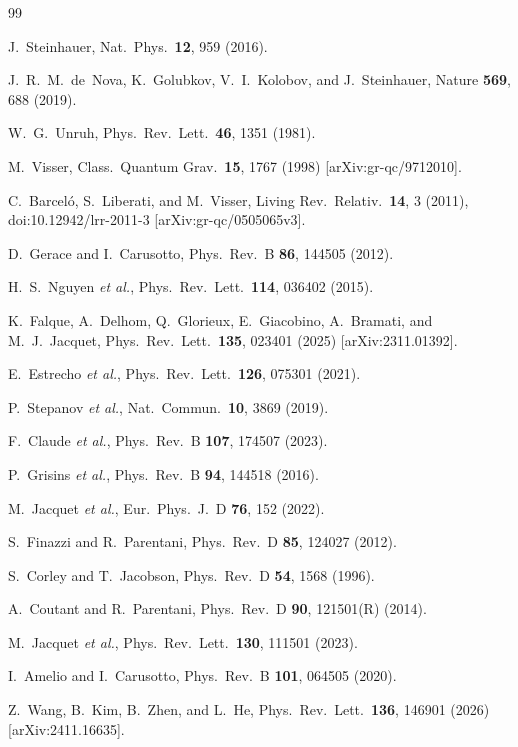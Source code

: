 \documentclass[aps,prl,twocolumn,superscriptaddress,nofootinbib]{revtex4-2}
\begin{document}
\begin{thebibliography}{99}

J.~Steinhauer, Nat.\ Phys.\ \textbf{12}, 959 (2016).

J.~R.~M.~de~Nova, K.~Golubkov, V.~I.~Kolobov, and J.~Steinhauer,
Nature \textbf{569}, 688 (2019).

W.~G.~Unruh, Phys.\ Rev.\ Lett.\ \textbf{46}, 1351 (1981).

M.~Visser, Class.\ Quantum Grav.\ \textbf{15}, 1767 (1998)
[arXiv:gr-qc/9712010].

C.~Barcel\'o, S.~Liberati, and M.~Visser,
Living Rev.\ Relativ.\ \textbf{14}, 3 (2011),
doi:10.12942/lrr-2011-3
[arXiv:gr-qc/0505065v3].

D.~Gerace and I.~Carusotto,
Phys.\ Rev.\ B \textbf{86}, 144505 (2012).

H.~S.~Nguyen \emph{et al.},
Phys.\ Rev.\ Lett.\ \textbf{114}, 036402 (2015).

K.~Falque, A.~Delhom, Q.~Glorieux, E.~Giacobino, A.~Bramati,
and M.~J.~Jacquet,
Phys.\ Rev.\ Lett.\ \textbf{135}, 023401 (2025)
[arXiv:2311.01392].

E.~Estrecho \emph{et al.},
Phys.\ Rev.\ Lett.\ \textbf{126}, 075301 (2021).

P.~Stepanov \emph{et al.},
Nat.\ Commun.\ \textbf{10}, 3869 (2019).

F.~Claude \emph{et al.},
Phys.\ Rev.\ B \textbf{107}, 174507 (2023).

P.~Grisins \emph{et al.},
Phys.\ Rev.\ B \textbf{94}, 144518 (2016).

M.~Jacquet \emph{et al.},
Eur.\ Phys.\ J.\ D \textbf{76}, 152 (2022).

S.~Finazzi and R.~Parentani,
Phys.\ Rev.\ D \textbf{85}, 124027 (2012).

S.~Corley and T.~Jacobson,
Phys.\ Rev.\ D \textbf{54}, 1568 (1996).

A.~Coutant and R.~Parentani,
Phys.\ Rev.\ D \textbf{90}, 121501(R) (2014).

M.~Jacquet \emph{et al.},
Phys.\ Rev.\ Lett.\ \textbf{130}, 111501 (2023).

I.~Amelio and I.~Carusotto,
Phys.\ Rev.\ B \textbf{101}, 064505 (2020).

Z.~Wang, B.~Kim, B.~Zhen, and L.~He,
Phys.\ Rev.\ Lett.\ \textbf{136}, 146901 (2026)
[arXiv:2411.16635].

\end{thebibliography}
\end{document}
